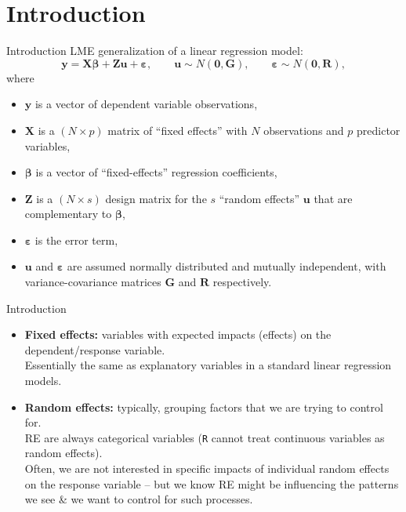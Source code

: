 \documentclass{beamer}
\begin{document}
\section{Introduction}
\begin{frame}{Introduction}
LME generalization of a linear regression model:
\medskip
$$
    \bm{y} = \bm{X \beta} + \bm{Z u} + \bm{\varepsilon},  
    \qquad \bm{u} \sim N(\bm{0}, \bm{G}),
    \qquad \bm{\varepsilon} \sim N(\bm{0}, \bm{R}),
$$
\medskip
\small
where 
\begin{itemize}
    \item[] $\bm{y}$ is a vector of dependent variable observations,
    \item[] $\bm{X}$ is a $(N\! \times \! p)$ matrix of ``fixed effects'' with $N$ observations and $p$ predictor variables,
    \item[] $\bm{\beta}$ is a vector of ``fixed-effects'' regression coefficients,
    \item[] $\bm{Z}$ is a $(N\! \times \! s)$ design matrix for the $s$ ``random effects'' $\bm{u}$ that are complementary to $\bm{\beta}$,
    \item[] $\bm{\varepsilon}$ is the error term,
    \item[] $\bm{u}$ and $\bm{\varepsilon}$ are assumed normally distributed and mutually independent, with variance-covariance matrices $\bm{G}$ and $\bm{R}$ respectively.
\end{itemize}   
\end{frame}
\begin{frame}{Introduction}
\begin{itemize}
    \item \textbf{Fixed effects:} variables with expected impacts (effects) on the dependent/response variable.\\ \medskip
    Essentially the same as explanatory variables in a standard linear regression models.
    \bigskip
    \item \textbf{Random effects:} typically, grouping factors that we are trying to control for. \\ \medskip RE are always categorical variables (\texttt{R} cannot treat continuous variables as random effects). \\ \medskip 
    Often, we are not interested in specific impacts of individual random effects on the response variable -- but we know RE might be influencing the patterns we see \& we want to control for such processes.
\end{itemize}
\end{frame}
\end{document}
